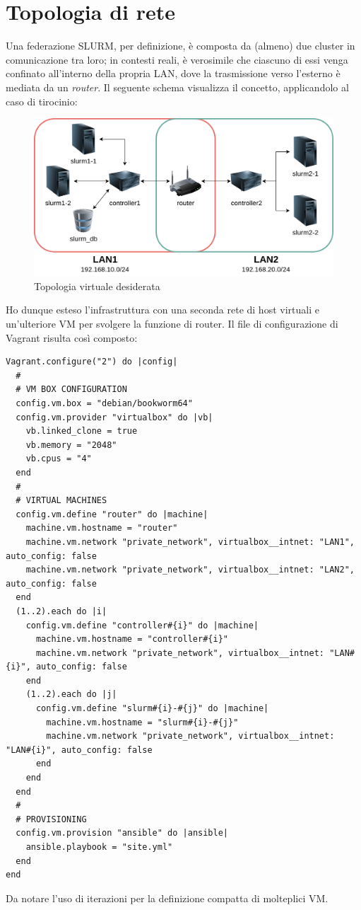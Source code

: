 \documentclass[12pt,a4paper,twoside,openright]{book}
\begin{document}
\section{Topologia di rete}
Una federazione \ac{SLURM}, per definizione, è composta da (almeno) due cluster in comunicazione tra loro; in contesti reali, è verosimile che ciascuno di essi venga confinato all'interno della propria \ac{LAN}, dove la trasmissione verso l'esterno è mediata da un \textit{router}. Il seguente schema visualizza il concetto, applicandolo al caso di tirocinio:
\begin{figure}[ht]
    \centering
    \includegraphics[width=0.9\linewidth]{images/topology.png}
    \caption{Topologia virtuale desiderata}
    \label{fig:topology}
\end{figure}

Ho dunque esteso l'infrastruttura con una seconda rete di host virtuali e un'ulteriore \ac{VM} per svolgere la funzione di router. Il file di configurazione di Vagrant risulta così composto:
\begin{verbatim}
Vagrant.configure("2") do |config|
  #
  # VM BOX CONFIGURATION
  config.vm.box = "debian/bookworm64"
  config.vm.provider "virtualbox" do |vb|
    vb.linked_clone = true
    vb.memory = "2048"
    vb.cpus = "4"
  end
  #
  # VIRTUAL MACHINES
  config.vm.define "router" do |machine|
    machine.vm.hostname = "router"
    machine.vm.network "private_network", virtualbox__intnet: "LAN1", auto_config: false
    machine.vm.network "private_network", virtualbox__intnet: "LAN2", auto_config: false
  end
  (1..2).each do |i|
    config.vm.define "controller#{i}" do |machine|
      machine.vm.hostname = "controller#{i}"
      machine.vm.network "private_network", virtualbox__intnet: "LAN#{i}", auto_config: false
    end
    (1..2).each do |j|
      config.vm.define "slurm#{i}-#{j}" do |machine|
        machine.vm.hostname = "slurm#{i}-#{j}"
        machine.vm.network "private_network", virtualbox__intnet: "LAN#{i}", auto_config: false
      end
    end
  end
  #
  # PROVISIONING
  config.vm.provision "ansible" do |ansible|
    ansible.playbook = "site.yml"
  end
end
\end{verbatim}
Da notare l'uso di iterazioni per la definizione compatta di molteplici \ac{VM}.
\end{document}
